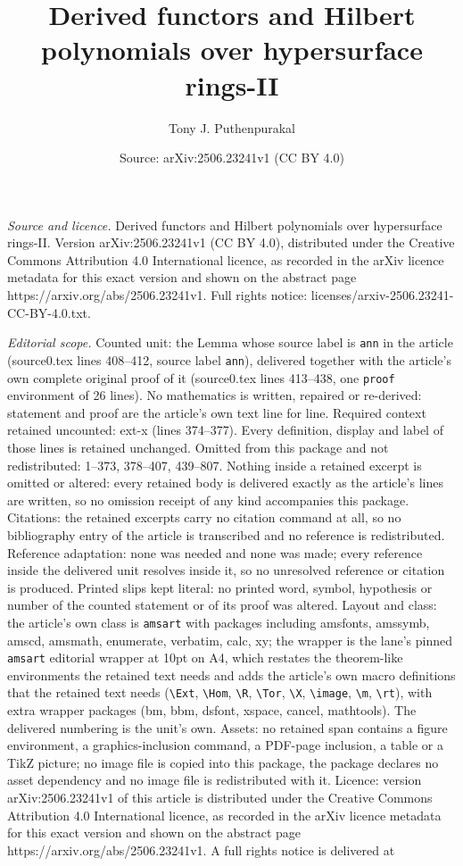 \documentclass[10pt,a4paper]{amsart}
\title[Derived functors and Hilbert polynomials over hypersurface r]{Derived functors and Hilbert polynomials over hypersurface rings-II}
\author{Tony J. Puthenpurakal}
\date{Source: arXiv:2506.23241v1 (CC BY 4.0)}
\begin{document}
\maketitle

\noindent\emph{Source and licence.} Derived functors and Hilbert polynomials over hypersurface rings-II. Version arXiv:2506.23241v1 (CC BY 4.0), distributed under the Creative Commons Attribution 4.0 International licence, as recorded in the arXiv licence metadata for this exact version and shown on the abstract page https://arxiv.org/abs/2506.23241v1. Full rights notice: licenses/arxiv-2506.23241-CC-BY-4.0.txt.\par\smallskip

\noindent\textit{Editorial scope.} Counted unit: the Lemma whose source label is \texttt{ann} in the article (source0.tex lines 408--412, source label \texttt{ann}), delivered together with the article's own complete original proof of it (source0.tex lines 413--438, one \texttt{proof} environment of 26 lines). No mathematics is written, repaired or re-derived: statement and proof are the article's own text line for line. Required context retained uncounted: ext-x (lines 374--377). Every definition, display and label of those lines is retained unchanged. Omitted from this package and not redistributed: 1--373, 378--407, 439--807. Nothing inside a retained excerpt is omitted or altered: every retained body is delivered exactly as the article's lines are written, so no omission receipt of any kind accompanies this package. Citations: the retained excerpts carry no citation command at all, so no bibliography entry of the article is transcribed and no reference is redistributed. Reference adaptation: none was needed and none was made; every reference inside the delivered unit resolves inside it, so no unresolved reference or citation is produced. Printed slips kept literal: no printed word, symbol, hypothesis or number of the counted statement or of its proof was altered. Layout and class: the article's own class is \texttt{amsart} with packages including amsfonts, amssymb, amscd, amsmath, enumerate, verbatim, calc, xy; the wrapper is the lane's pinned \texttt{amsart} editorial wrapper at 10pt on A4, which restates the theorem-like environments the retained text needs and adds the article's own macro definitions that the retained text needs (\texttt{\textbackslash Ext}, \texttt{\textbackslash Hom}, \texttt{\textbackslash R}, \texttt{\textbackslash Tor}, \texttt{\textbackslash X}, \texttt{\textbackslash image}, \texttt{\textbackslash m}, \texttt{\textbackslash rt}), with extra wrapper packages (bm, bbm, dsfont, xspace, cancel, mathtools). The delivered numbering is the unit's own. Assets: no retained span contains a figure environment, a graphics-inclusion command, a PDF-page inclusion, a table or a TikZ picture; no image file is copied into this package, the package declares no asset dependency and no image file is redistributed with it. Licence: version arXiv:2506.23241v1 of this article is distributed under the Creative Commons Attribution 4.0 International licence, as recorded in the arXiv licence metadata for this exact version and shown on the abstract page https://arxiv.org/abs/2506.23241v1. A full rights notice is delivered at 
\end{document}
